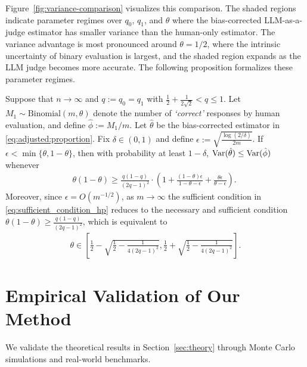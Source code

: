 Figure~\ref{fig:variance-comparison} visualizes this comparison. The shaded regions indicate parameter regimes over $q_0$, $q_1$, and $\theta$ where the bias-corrected LLM-as-a-judge estimator has smaller variance than the human-only estimator. The variance advantage is most pronounced around $\theta=1/2$, where the intrinsic uncertainty of binary evaluation is largest, and the shaded region expands as the LLM judge becomes more accurate. The following proposition formalizes these parameter regimes.



\begin{proposition}
    \label{thm:variance_region}
    Suppose that $n \to \infty$ and $q := q_0 = q_1$ with $\frac{1}{2} + \frac{1}{2\sqrt{2}} < q \leq 1$.
    Let $M_1 \sim \mathrm{Binomial}(m, \theta)$ denote the number of \emph{`correct'} responses by human evaluation, and define $\hat{\phi} := M_1 / m$.
    Let $\hat{\theta}$ be the bias-corrected estimator in \eqref{eq:adjusted:proportion}.
    Fix $\delta\in(0,1)$ and define $\epsilon := \sqrt{\tfrac{\log(2/\delta)}{2m}}$.
    If $\epsilon < \min\{\theta,1-\theta\}$, then with probability at least $1-\delta$, $\displaystyle \mathrm{Var}(\hat{\theta}) \leq \displaystyle \mathrm{Var}(\hat{\phi})$ whenever
    \begin{align}
        \!\!\!
        \theta(1-\theta)
        \geq
        \frac{q(1-q)}{(2q-1)^2}
        \!\cdot\!
        \left(
            1
            +
            \frac{(1-\theta)\epsilon}{1-\theta-\epsilon}
            +
            \frac{\theta\epsilon}{\theta-\epsilon}
        \right)
        \!.\;
        \label{eq:sufficient_condition_hp}
    \end{align}
    Moreover, since $\epsilon = O(m^{-1/2})$, as $m\to\infty$ the sufficient condition in \eqref{eq:sufficient_condition_hp} reduces to the necessary and sufficient condition $\theta(1-\theta)\ge \frac{q(1-q)}{(2q-1)^2}$, which is equivalent to
    \begin{align}
        \theta \in
        \left[
            \tfrac{1}{2}-\sqrt{\tfrac{1}{2}-\tfrac{1}{4(2q-1)^2}},
            \tfrac{1}{2}+\sqrt{\tfrac{1}{2}-\tfrac{1}{4(2q-1)^2}}
        \right]
        .
    \end{align}
\end{proposition}

\section{Empirical Validation of Our Method}\label{sec:experiment}
We validate the theoretical results in Section~\ref{sec:theory} through Monte Carlo simulations and real-world benchmarks.

